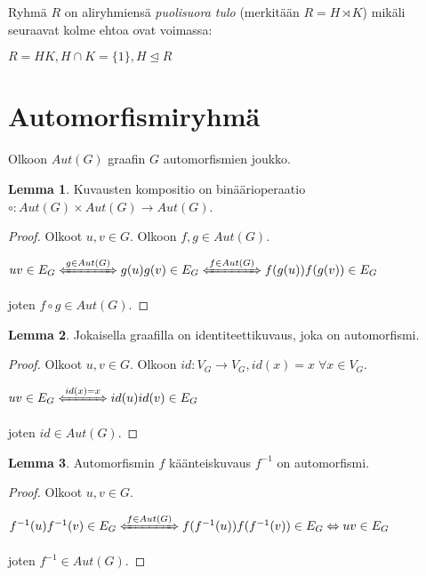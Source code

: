 \documentclass[a4paper, 12pt]{article}
\theoremstyle{definition}
\newtheorem{lemma}{Lemma}
\theoremstyle{plain}
\begin{document}
Ryhmä $R$ on aliryhmiensä \emph{puolisuora tulo} (merkitään $R = H \rtimes K$) mikäli seuraavat kolme ehtoa ovat voimassa:
\begin{center}
\begin{math}
R = HK,  H \cap K = \{ 1\}, H \trianglelefteq R
\end{math}
\end{center}

\section{Automorfismiryhmä}

Olkoon $Aut(G)$ graafin $G$ automorfismien joukko.

\begin{lemma}
\label{lemma:binaarirelaatio}
Kuvausten kompositio on binäärioperaatio $\circ : Aut(G) \times Aut(G) \rightarrow Aut(G)$.
\begin{proof}
Olkoot $u, v \in G$. Olkoon $f, g \in Aut(G)$.
\begin{center}
\begin{math}
uv \in E_G \xLeftrightarrow{g \in Aut(G)} g(u)g(v) \in E_G  \xLeftrightarrow{f \in Aut(G)} f(g(u))f(g(v)) \in E_G 
\end{math}
\end{center}
joten $f \circ g \in Aut(G)$.
\end{proof}
\end{lemma}

\begin{lemma}
\label{lemma:identiteetti}
Jokaisella graafilla on identiteettikuvaus, joka on automorfismi.
\begin{proof}
Olkoot $u, v \in G$. Olkoon $id: V_G \rightarrow V_G, id(x) = x \; \forall x \in V_G$.
\begin{center}
\begin{math}
uv \in E_G \xLeftrightarrow{id(x) = x} id(u)id(v) \in E_G  
\end{math}
\end{center}
joten $id \in Aut(G)$.
\end{proof}
\end{lemma}

\begin{lemma}
\label{lemma:kaanteiskuvaus}
Automorfismin $f$ käänteiskuvaus $f^{-1}$ on automorfismi.
\begin{proof}
Olkoot $u, v \in G$.
\begin{center}
\begin{math}
f^{-1}(u)f^{-1}(v) \in E_G \xLeftrightarrow{f \in Aut(G)} f(f^{-1}(u))f(f^{-1}(v)) \in E_G \Leftrightarrow uv \in E_G
\end{math}
\end{center}
joten $f^{-1} \in Aut(G)$.
\end{proof}
\end{lemma}
\end{document}
